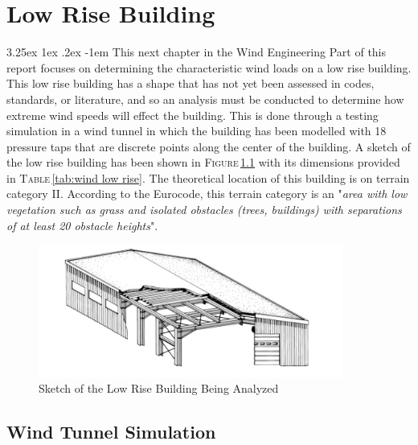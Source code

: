 \documentclass[11pt,a4paper,titlepage]{report}
\makeatletter
\renewcommand\paragraph{\@startsection{paragraph}{5}{\z@}%
  {3.25ex \@plus1ex \@minus.2ex}%
  {-1em}%
  {\normalfont\normalsize\bfseries}}
\makeatother
\begin{document}
\chapter{Low Rise Building}
\paragraph{}This next chapter in the Wind Engineering Part of this report focuses on determining the characteristic wind loads on a low rise building. This low rise building has a shape that has not yet been assessed in codes, standards, or literature, and so an analysis must be conducted to determine how extreme wind speeds will effect the building. This is done through a testing simulation in a wind tunnel in which the building has been modelled with 18 pressure taps that are discrete points along the center of the building. A sketch of the low rise building has been shown in \textsc{Figure}\,\ref{fig:I.6: wind low rise} with its dimensions provided in \textsc{Table}\,\ref{tab:wind low rise}. The theoretical location of this building is on terrain category II. According to the Eurocode, this terrain category is an "\textit{area with low vegetation such as grass and isolated obstacles (trees, buildings) with separations of at least 20 obstacle heights}"\cite{WE}. 
\begin{figure}
    \centering
    \includegraphics[width=10cm]{Wind_Low_Rise.jpeg}
    \caption{Sketch of the Low Rise Building Being Analyzed \cite{WE}}
    \label{fig:I.6: wind low rise}
\end{figure}
\section{Wind Tunnel Simulation}
\end{document}

